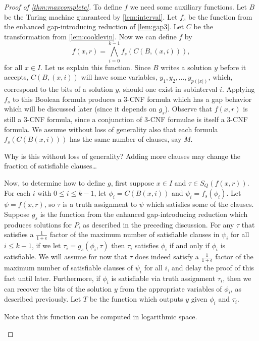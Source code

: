 \documentclass[]{article}
\begin{document}
\begin{proof}[Proof of \autoref{thm:maxcomplete}]
  To define $f$ we need some auxiliary functions.
  Let $B$ be the Turing machine guaranteed by \autoref{lem:interval}.
  Let $f_s$ be the function from the enhanced gap-introducing reduction of \autoref{lem:gap3}.
  Let $C$ be the transformation from \autoref{lem:cooklevin}.
  Now we can define $f$ by
  \begin{displaymath}
    f(x, r) = \bigwedge_{i = 0}^{k - 1}{f_s(C(B, (x, i)))},
  \end{displaymath}
  for all $x \in I$.
  Let us explain this function.
  Since $B$ writes a solution $y$ before it accepts, $C(B, (x, i))$ will have some variables, $y_1, y_2, \dotsc, y_{p(|x|)}$, which, correspond to the bits of a solution $y$, should one exist in subinterval $i$.
  Applying $f_s$ to this Boolean formula produces a 3-CNF formula which has a gap behavior which will be discussed later (since it depends on $g_s$).
  Observe that $f(x, r)$ is still a 3-CNF formula, since a conjunction of 3-CNF formulae is itself a 3-CNF formula.
  We assume without loss of generality also that each formula $f_s(C(B(x, i)))$ has the same number of clauses, say $M$.
  \begin{todo}
    Why is this without loss of generality?
    Adding more clauses may change the fraction of satisfiable clauses\ldots
  \end{todo}

  Now, to determine how to define $g$, first suppose $x \in I$ and $\tau \in S_Q(f(x, r))$.
  For each $i$ with $0 \leq i \leq k - 1$, let $\phi_i = C(B(x, i))$ and $\psi_i = f_s(\phi_i)$.
  Let $\psi = f(x, r)$, so $\tau$ is a truth assignment to $\psi$ which satisfies some of the clauses.
  Suppose $g_s$ is the function from the enhanced gap-introducing reduction which produces solutions for $P$, as described in the preceding discussion.
  For any $\tau$ that satisfies a $\frac{1}{1 + \epsilon}$ factor of the maximum number of satisfiable clauses in $\psi_i$ for all $i \leq k - 1$, if we let $\tau_i = g_s(\phi_i, \tau)$ then $\tau_i$ satisfies $\phi_i$ if and only if $\phi_i$ is satisfiable.
  We will assume for now that $\tau$ does indeed satisfy a $\frac{1}{1 + \epsilon}$ factor of the maximum number of satisfiable clauses of $\psi_i$ for all $i$, and delay the proof of this fact until later.
  Furthermore, if $\phi_i$ is satisfiable via truth assignment $\tau_i$, then we can recover the bits of the solution $y$ from the appropriate variables of $\phi_i$, as described previously.
  Let $T$ be the function which outputs $y$ given $\phi_i$ and $\tau_i$.
  \begin{todo}
    Note that this function can be computed in logarithmic space.
  \end{todo}


\end{proof}
\end{document}
